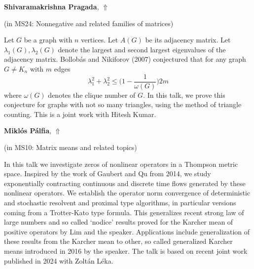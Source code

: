 \documentclass[ILAS2025-program.tex]{subfiles}
\begin{document}
\hypertarget{down0199}{}\begin{ilasabstract}
    
\textbf{Shivaramakrishna Pragada},  \hfill \hyperlink{up0199}{$\Uparrow$}
    
    
(in {\color{mstitle}MS24: Nonnegative and related families of matrices})
        
\mtskip
    Let $G$ be a graph with $n$ vertices. Let $A(G)$ be its adjacency matrix. Let $\lambda_1(G), \lambda_2(G)$ denote the largest and second largest eigenvalues of the adjacency matrix. Bollob\'{a}s and Nikiforov (2007) conjectured that for any graph $G \neq K_n$ with $m$ edges
\[\lambda_1^2+\lambda_2^2\le \bigg( 1-\frac{1}{\omega(G)}\bigg)2m\]
where $\omega(G)$ denotes the clique number of $G$. In this talk, we prove this conjecture for graphs with not so many triangles, using the method of triangle counting. This is a joint work with Hitesh Kumar.

\end{ilasabstract}
    

\hypertarget{down0132}{}\begin{ilasabstract}
    
\textbf{Miklós Pálfia},  \hfill \hyperlink{up0132}{$\Uparrow$}
    
    
(in {\color{mstitle}MS10: Matrix means and related topics})
        
\mtskip
    In this talk we investigate zeros of nonlinear operators in a Thompson metric space. Inspired by the work of Gaubert and Qu from 2014, we study exponentially contracting continuous and discrete time flows generated by these nonlinear operators. We establish the operator norm convergence of deterministic and stochastic resolvent and proximal type algorithms, in particular versions coming from a Trotter-Kato type formula. This generalizes recent strong law of large numbers and so called `nodice' results proved for the Karcher mean of positive operators by Lim and the speaker. Applications include generalization of these results from the Karcher mean to other, so called generalized Karcher means introduced in 2016 by the speaker. The talk is based on recent joint work published in 2024 with Zoltán Léka.
\end{ilasabstract}
    
\end{document}
